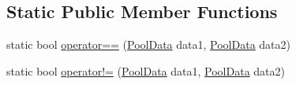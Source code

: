 \subsection*{Static Public Member Functions}
\begin{DoxyCompactItemize}
\item 
static bool \hyperlink{class_darkhexxa_1_1_simple_pool_1_1_simple_pool_1_1_pool_data_a2ec19cce5e6f1b26aa952c5301b98fef}{operator==} (\hyperlink{class_darkhexxa_1_1_simple_pool_1_1_simple_pool_1_1_pool_data}{Pool\-Data} data1, \hyperlink{class_darkhexxa_1_1_simple_pool_1_1_simple_pool_1_1_pool_data}{Pool\-Data} data2)
\item 
static bool \hyperlink{class_darkhexxa_1_1_simple_pool_1_1_simple_pool_1_1_pool_data_addc62fa3d584aa771c25dcefa4a18986}{operator!=} (\hyperlink{class_darkhexxa_1_1_simple_pool_1_1_simple_pool_1_1_pool_data}{Pool\-Data} data1, \hyperlink{class_darkhexxa_1_1_simple_pool_1_1_simple_pool_1_1_pool_data}{Pool\-Data} data2)
\end{DoxyCompactItemize}
